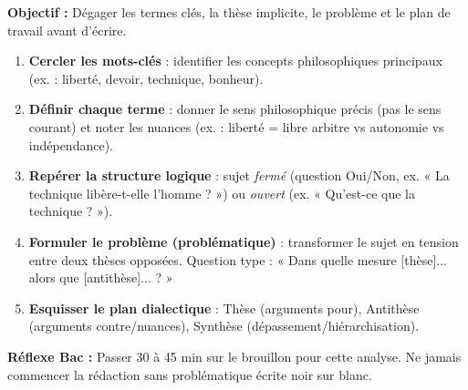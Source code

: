 \documentclass[11pt]{article}
\newcommand{\cle}[1]{{\popxbold\color{popdark}#1}}
\begin{document}
\begin{methode}
\textbf{Objectif :} Dégager les termes clés, la thèse implicite, le problème et le plan de travail avant d'écrire.
\begin{enumerate}
    \item \textbf{Cercler les mots-clés} : identifier les concepts philosophiques principaux (ex. : \cle{liberté}, \cle{devoir}, \cle{technique}, \cle{bonheur}).
    \item \textbf{Définir chaque terme} : donner le sens philosophique précis (pas le sens courant) et noter les nuances (ex. : liberté = libre arbitre vs autonomie vs indépendance).
    \item \textbf{Repérer la structure logique} : sujet \emph{fermé} (question Oui/Non, ex. « La technique libère-t-elle l'homme ? ») ou \emph{ouvert} (ex. « Qu'est-ce que la technique ? »).
    \item \textbf{Formuler le problème (problématique)} : transformer le sujet en tension entre deux thèses opposées. Question type : « Dans quelle mesure [thèse]... alors que [antithèse]... ? »
    \item \textbf{Esquisser le plan dialectique} : Thèse (arguments pour), Antithèse (arguments contre/nuances), Synthèse (dépassement/hiérarchisation).
\end{enumerate}
\textbf{Réflexe Bac :} Passer 30 à 45 min sur le brouillon pour cette analyse. Ne jamais commencer la rédaction sans problématique écrite noir sur blanc.
\end{methode}
\end{document}
